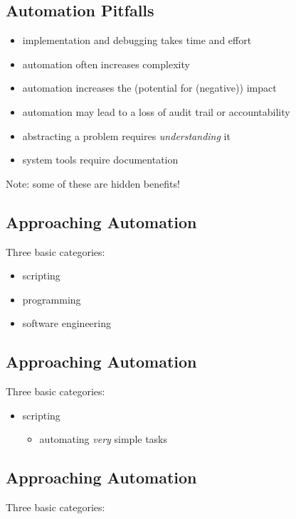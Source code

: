 \documentclass[xga]{xdvislides}
\begin{document}
\subsection{Automation Pitfalls}
\begin{itemize}
	\item implementation and debugging takes time and effort
	\item automation often increases complexity
	\item automation increases the (potential for (negative)) impact
	\item automation may lead to a loss of audit trail or accountability
	\item abstracting a problem requires {\em understanding} it
	\item system tools require documentation
\end{itemize}
\vspace{.5in}
Note: some of these are hidden benefits!


\subsection{Approaching Automation}
Three basic categories:
\\

\begin{itemize}
	\item scripting
	\item programming
	\item software engineering
\end{itemize}

\subsection{Approaching Automation}
Three basic categories:
\\

\begin{itemize}
	\item scripting
		\begin{itemize}
			\item automating {\em very} simple tasks
		\end{itemize}
\end{itemize}

\subsection{Approaching Automation}
Three basic categories:
\\
\end{document}

